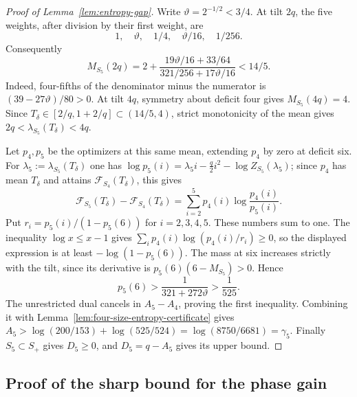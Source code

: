 \documentclass[a4paper,10pt,reqno]{amsart}
\numberwithin{equation}{section}
\theoremstyle{plain}
\theoremstyle{remark}
\begin{document}
\begin{proof}[Proof of Lemma~\ref{lem:entropy-gap}]
Write $\vartheta=2^{-1/2}<3/4$. At tilt $2q$, the five weights, after
division by their first weight, are
\[
 1,\quad\vartheta,\quad1/4,\quad\vartheta/16,\quad1/256.
\]
Consequently
\[
 M_{S_5}(2q)=2+
 \frac{19\vartheta/16+33/64}{321/256+17\vartheta/16}<14/5.
\]
Indeed, four-fifths of the denominator minus the numerator is
$(39-27\vartheta)/80>0$. At tilt $4q$, symmetry about deficit four gives
$M_{S_5}(4q)=4$. Since
$T_\delta\in[2/q,1+2/q]\subset(14/5,4)$, strict monotonicity of the mean
gives $2q<\lambda_{S_5}(T_\delta)<4q$.

Let $p_4,p_5$ be the optimizers at this same mean, extending $p_4$ by zero
at deficit six. For $\lambda_5:=\lambda_{S_5}(T_\delta)$ one has
$\log p_5(i)=\lambda_5i-\frac q2i^2-\log Z_{S_5}(\lambda_5)$; since $p_4$ has
mean $T_\delta$ and attains $\mathcal F_{S_4}(T_\delta)$, this gives
\[
 \mathcal F_{S_5}(T_\delta)-\mathcal F_{S_4}(T_\delta)
 =\sum_{i=2}^5p_4(i)\log\frac{p_4(i)}{p_5(i)}.
\]
Put $r_i=p_5(i)/(1-p_5(6))$ for $i=2,3,4,5$. These numbers sum to one.
The inequality $\log x\le x-1$ gives
$\sum_i p_4(i)\log(p_4(i)/r_i)\ge0$, so the displayed expression is at
least $-\log(1-p_5(6))$.
The mass at six increases strictly with the tilt, since its derivative is
$p_5(6)(6-M_{S_5})>0$. Hence
\[
 p_5(6)>\frac1{321+272\vartheta}>\frac1{525}.
\]
The unrestricted dual cancels in $A_5-A_4$, proving the first inequality.
Combining it with Lemma~\ref{lem:four-size-entropy-certificate} gives
$A_5>\log(200/153)+\log(525/524)=\log(8750/6681)=\gamma_5$.
Finally $S_5\subset S_+$ gives $D_5\ge0$, and $D_5=q-A_5$ gives its
upper bound.
\end{proof}

\subsection{Proof of the sharp bound for the phase gain}
\label{app:phase-gain-sharp-proof}
\end{document}
